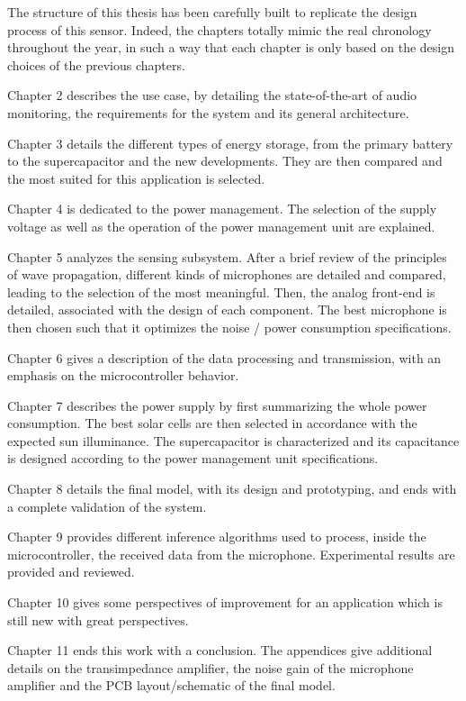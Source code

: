 \documentclass{EPL-master-thesis-covers-EN}
\begin{document}
The structure of this thesis has been carefully built to replicate the design process of this sensor. Indeed, the chapters totally mimic the real chronology throughout the year, in such a way that each chapter is only based on the design choices of the previous chapters. 

Chapter 2 describes the use case, by detailing the state-of-the-art of audio monitoring, the requirements for the system and its general architecture.

Chapter 3 details the different types of energy storage, from the primary battery to the supercapacitor and the new developments. They are then compared and the most suited for this application is selected.  

Chapter 4 is dedicated to the power management. The selection of the supply voltage as well as the operation of the power management unit are explained.

Chapter 5 analyzes the sensing subsystem. After a brief review of the principles of wave propagation, different kinds of microphones are detailed and compared, leading to the selection of the most meaningful. Then, the analog front-end is detailed, associated with the design of each component. The best microphone is then chosen such that it optimizes the noise / power consumption specifications.

Chapter 6 gives a description of the data processing and transmission, with an emphasis on the microcontroller behavior.

Chapter 7 describes the power supply by first summarizing the whole power consumption. The best solar cells are then selected in accordance with the expected sun illuminance. The supercapacitor is characterized and its capacitance is designed according to the power management unit specifications.

Chapter 8 details the final model, with its design and prototyping, and ends with a complete validation of the system.

Chapter 9 provides different inference algorithms used to process, inside the microcontroller, the received data from the microphone. Experimental results are provided and reviewed.

Chapter 10 gives some perspectives of improvement for an application which is still new with great perspectives.

Chapter 11 ends this work with a conclusion. The appendices give additional details on the transimpedance amplifier, the noise gain of the microphone amplifier and the PCB layout/schematic of the final model.
\end{document}
